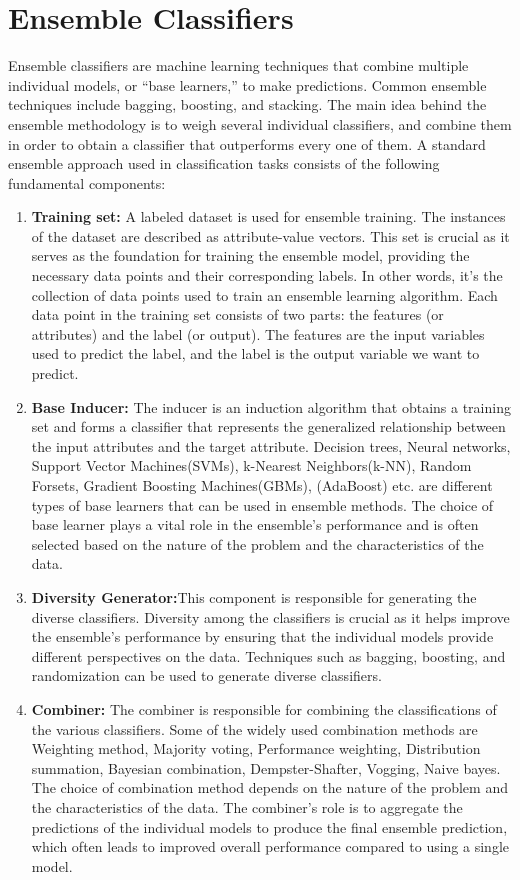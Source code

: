 \section{Ensemble Classifiers}
Ensemble classifiers are machine learning techniques that combine multiple individual models, or ``base learners,'' to make predictions. Common ensemble techniques include bagging, boosting, and stacking. The main idea behind the ensemble methodology is to weigh several individual classifiers, and combine them in order to obtain a classifier that outperforms every one of them. A standard ensemble approach used in classification tasks consists of the following fundamental components:
\begin{enumerate}
    \item \textbf{Training set:} A labeled dataset is used for ensemble training. The instances of the dataset are described as attribute-value vectors. This set is crucial as it serves as the foundation for training the ensemble model, providing the necessary data points and their corresponding labels. In other words, it's the collection of data points used to train an ensemble learning algorithm. Each data point in the training set consists of two parts: the features (or attributes) and the label (or output). The features are the input variables used to predict the label, and the label is the output variable we want to predict.
    \item \textbf{Base Inducer:} The inducer is an induction algorithm that obtains a training set and forms a classifier that represents the generalized relationship between the input attributes and the target attribute. Decision trees, Neural networks, Support Vector Machines(SVMs), k-Nearest Neighbors(k-NN), Random Forsets, Gradient Boosting Machines(GBMs), (AdaBoost) etc. are different types of base learners that can be used in ensemble methods. The choice of base learner plays a vital role in the ensemble's performance and is often selected based on the nature of the problem and the characteristics of the data.
    \item \textbf{Diversity Generator:}This component is responsible for generating the diverse classifiers. Diversity among the classifiers is crucial as it helps improve the ensemble's performance by ensuring that the individual models provide different perspectives on the data. Techniques such as bagging, boosting, and randomization can be used to generate diverse classifiers.
    \item \textbf{Combiner:} The combiner is responsible for combining the classifications of the various classifiers. Some of the widely used combination methods are Weighting method, Majority voting, Performance weighting, Distribution summation, Bayesian combination, Dempster-Shafter, Vogging, Naive bayes. The choice of combination method depends on the nature of the problem and the characteristics of the data. The combiner's role is to aggregate the predictions of the individual models to produce the final ensemble prediction, which often leads to improved overall performance compared to using a single model.\cite{21} 
\end{enumerate}
